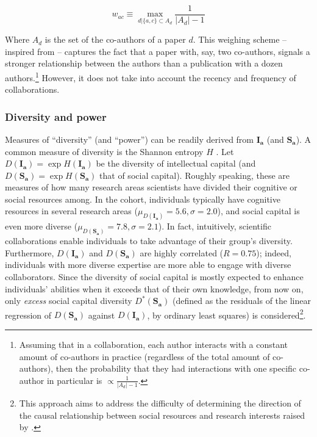 \documentclass{article}
\begin{document}
\begin{equation}
    w_{ac} \equiv \max_{d|\{a,c\} \subset A_d} \frac{1}{|A_d|-1}
    \label{eq:weighing_scheme}
\end{equation}

Where $A_d$ is the set of the co-authors of a paper $d$. This weighing scheme -- inspired from \citealt{Newman2004} -- captures the fact that a paper with, say, two co-authors, signals a stronger relationship between the authors than a publication with a dozen authors.\footnote{Assuming that in a collaboration, each author interacts with a constant amount of co-authors in practice (regardless of the total amount of co-authors), then the probability that they had interactions with one specific co-author in particular is $\propto \frac{1}{|A_d|-1}$. 
} However, it does not take into account the recency and frequency of collaborations.

\subsubsection{Diversity and power}

Measures of ``diversity'' (and ``power'') can be readily derived from $\bm{I_a}$ (and $\bm{S_a}$). A common measure of diversity is the Shannon entropy $H$ \citep{Jost2006}. Let 
 $D(\bm{I_a})=\exp{H(\bm{I_a})}$ be the diversity of intellectual capital (and $D(\bm{S_a})=\exp{H(\bm{S_a})}$ that of social capital). Roughly speaking, these are measures of how many research areas scientists have
divided their cognitive or social resources among. In the cohort, individuals typically have cognitive resources in several research areas ($\mu_{D(\bm{I_a})}=5.6,\sigma=2.0$), and social capital is even more diverse ($\mu_{D(\bm{S_a})}=7.8,\sigma=2.1$). In fact, intuitively,  scientific collaborations enable individuals to take advantage of their group's diversity. Furthermore, $D(\bm{I_a})$ and $D(\bm{S_a})$ are highly correlated ($R=0.75$); indeed, individuals with more diverse expertise are more able to engage with diverse collaborators. Since the diversity of social capital is mostly expected to enhance individuals' abilities when it exceeds that of their own knowledge, from now on, only \textit{excess} social capital diversity $D^{\ast}(\bm{S_a})$ (defined as the residuals of the linear regression of $D(\bm{S_a})$ against $D(\bm{I_a})$, by ordinary least squares) is considered\footnote{This approach aims to address the difficulty of determining the direction of the causal relationship between social resources and research interests raised by \citet{Tripodi2020}.}.
\end{document}
